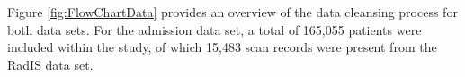 \documentclass[../thesis.tex]{subfiles}
\begin{document}
Figure \ref{fig:FlowChartData} provides an overview of the data cleansing process for both data sets. For the admission data set, a total of 165,055 patients were included within the study, of which 15,483 scan records were present from the RadIS data set.


\end{document}
